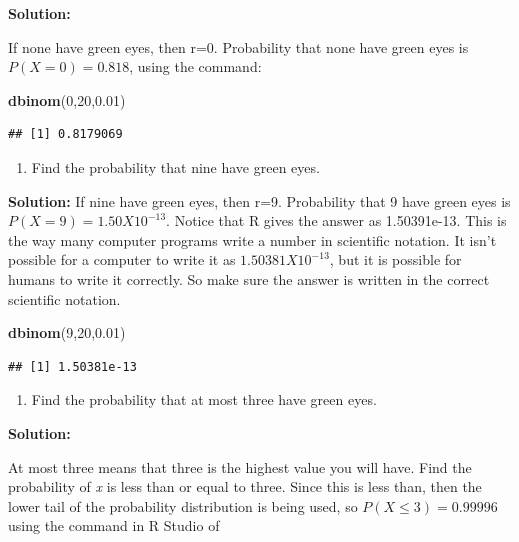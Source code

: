 \documentclass[]{book}
\newenvironment{Shaded}{\begin{snugshade}}{\end{snugshade}}
\newcommand{\DecValTok}[1]{\textcolor[rgb]{0.00,0.00,0.81}{#1}}
\newcommand{\FloatTok}[1]{\textcolor[rgb]{0.00,0.00,0.81}{#1}}
\newcommand{\KeywordTok}[1]{\textcolor[rgb]{0.13,0.29,0.53}{\textbf{#1}}}
\newcommand{\NormalTok}[1]{#1}
\providecommand{\tightlist}{%
  \setlength{\itemsep}{0pt}\setlength{\parskip}{0pt}}
\begin{document}
\textbf{Solution:}

If none have green eyes, then r=0. Probability that none have green eyes is \(P(X=0)=0.818\), using the command:

\begin{Shaded}
\begin{Highlighting}[]
\KeywordTok{dbinom}\NormalTok{(}\DecValTok{0}\NormalTok{,}\DecValTok{20}\NormalTok{,}\FloatTok{0.01}\NormalTok{)}
\end{Highlighting}
\end{Shaded}

\begin{verbatim}
## [1] 0.8179069
\end{verbatim}

\begin{enumerate}
\def\labelenumi{\alph{enumi}.}
\setcounter{enumi}{3}
\tightlist
\item
  Find the probability that nine have green eyes.
\end{enumerate}

\textbf{Solution:}
If nine have green eyes, then r=9. Probability that 9 have green eyes is \(P(X=9)=1.50X10^{-13}\). Notice that R gives the answer as 1.50391e-13. This is the way many computer programs write a number in scientific notation. It isn't possible for a computer to write it as \(1.50381X10^{-13}\), but it is possible for humans to write it correctly. So make sure the answer is written in the correct scientific notation.

\begin{Shaded}
\begin{Highlighting}[]
\KeywordTok{dbinom}\NormalTok{(}\DecValTok{9}\NormalTok{,}\DecValTok{20}\NormalTok{,}\FloatTok{0.01}\NormalTok{)}
\end{Highlighting}
\end{Shaded}

\begin{verbatim}
## [1] 1.50381e-13
\end{verbatim}

\begin{enumerate}
\def\labelenumi{\alph{enumi}.}
\setcounter{enumi}{4}
\tightlist
\item
  Find the probability that at most three have green eyes.
\end{enumerate}

\textbf{Solution:}

At most three means that three is the highest value you will have. Find the probability of \emph{x} is less than or equal to three. Since this is less than, then the lower tail of the probability distribution is being used, so \(P(X \le 3)=0.99996\) using the command in R Studio of
\end{document}
